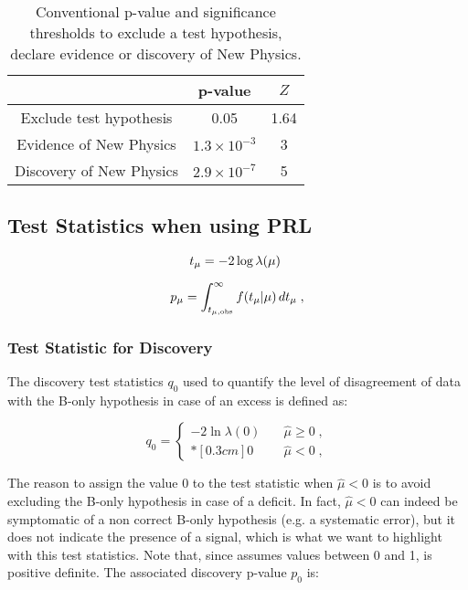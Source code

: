 \begin{table}
\center
\begin{tabular}{|c|c|c|}
\hline 
 & p-value  & $Z$ \\ 
\hline 
\hline 
Exclude test hypothesis & 0.05 & 1.64 \\ 
\hline 
Evidence of New Physics & $1.3 \times 10^{-3}$ & 3 \\ 
\hline 
Discovery of New Physics & $2.9 \times 10^{-7}$ & 5 \\ 
\hline 
\end{tabular}
\caption{Conventional p-value and significance thresholds to exclude a test hypothesis, declare evidence or discovery of New Physics.}
\label{tab:stat:thresholds}
\end{table}




\subsection{Test Statistics when using PRL}

\begin{equation}
\label{eq:stat:tmu}
t_{\mu} = -2 \log \lambda(\mu) \ 
\end{equation}

\begin{equation}
\label{eq:stat:pmu}
p_{\mu} = \int_{t_{\mu,{\rm obs}}}^{\infty} f(t_{\mu} | \mu ) \,
d t_{\mu} \;,
\end{equation}

\subsubsection*{Test Statistic for Discovery}

The discovery test statistics $q_{0}$ used to quantify the level of disagreement of data with the B-only hypothesis in case of an excess is defined as:

\begin{equation}
\label{eq:stat:q0}
q_{0} =
\left\{ \! \! \begin{array}{ll}
               - 2 \ln \lambda(0)
               & \quad \hat{\mu} \ge 0 \;, \\*[0.3 cm]
               0 & \quad \hat{\mu} < 0  \;,
              \end{array}
       \right.
\end{equation}
 
\noindent The reason to assign the value 0 to the test statistic when $\hat{\mu} < 0$ is to avoid excluding the B-only hypothesis in case of a deficit. In fact, $\hat{\mu} < 0$ can indeed be symptomatic of a non correct B-only hypothesis (e.g. a systematic error), but it does not indicate the presence of a signal, which is what we want to highlight with this test statistics. Note that, since \prl assumes values between 0 and 1, \qzero is positive definite. The associated discovery p-value $p_{0}$ is:


